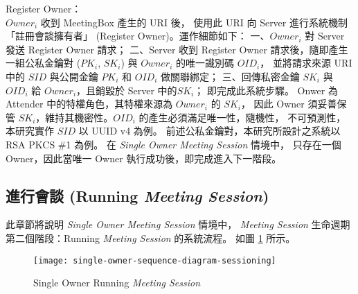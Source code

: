 \begin{steps}
    \item Register Owner：\\
        $Owner_{i}$ 收到 MeetingBox 產生的 URI 後，
        使用此 URI 向 Server 進行系統機制「註冊會談擁有者」 (Register Owner)。運作細節如下：
        一、$Owner_{i}$ 對 Server 發送 Register Owner 請求；
        二、Server 收到 Register Owner 請求後，隨即產生一組公私金鑰對 ($PK_{i}$, $SK_{i}$)
        與 $Owner_{i}$ 的唯一識別碼 $OID_{i}$，
        並將請求來源 URI 中的 $SID$ 與公開金鑰 $PK_{i}$ 和 $OID_{i}$ 做關聯綁定；
        三、回傳私密金鑰 $SK_{i}$ 與 $OID_{i}$ 給 $Owner_{i}$，且銷毀於 Server 中的$SK_{i}$；
        即完成此系統步驟。
        Onwer 為 Attender 中的特權角色，其特權來源為 $Owner_{i}$ 的 $SK_{i}$，
        因此 Owner 須妥善保管 $SK_{i}$，維持其機密性。$OID_{i}$ 的產生必須滿足唯一性，隨機性，
        不可預測性，本研究實作 $SID$ 以 UUID v4 為例。
        前述公私金鑰對，本研究所設計之系統以 RSA PKCS \#1 為例。
        在 {\it Single Owner Meeting Session} 情境中，
        只存在一個 Owner，因此當唯一 Owner 執行成功後，即完成進入下一階段。
\end{steps}

\subsection{進行會談 (Running {\it Meeting Session})}

    此章節將說明 {\it Single Owner Meeting Session} 情境中，
{\it Meeting Session} 生命週期第二個階段：Running {\it Meeting Session} 的系統流程。
如圖 \ref{fig.s-o-sessioning} 所示。

\begin{figure}[H]
    \centering
    \texttt{[image: single-owner-sequence-diagram-sessioning]}
    \caption{Single Owner Running {\it Meeting Session}}
    \label{fig.s-o-sessioning}
\end{figure}

